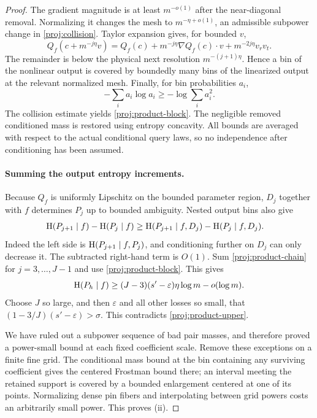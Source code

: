 \begin{proof}
The gradient magnitude is at least $m^{-o(1)}$ after the
near-diagonal removal. Normalizing it changes the mesh to
$m^{-\eta+o(1)}$, an admissible subpower change in
\eqref{proj:collision}. Taylor expansion gives, for bounded $v$,
\[
 Q_f(c+m^{-j\eta}v)
 =Q_f(c)+m^{-j\eta}\nabla Q_f(c)\cdot v
      +m^{-2j\eta}v_rv_t.
\]
The remainder is below the physical next resolution
$m^{-(j+1)\eta}$. Hence a bin of the nonlinear output is
covered by boundedly many bins of the linearized output at the
relevant normalized mesh. Finally, for bin probabilities $a_i$,
\[
 -\sum_i a_i\log a_i\ge-\log\sum_i a_i^2.
\]
The collision estimate yields \eqref{proj:product-block}.
The negligible removed conditioned mass is restored using
entropy concavity. All bounds are averaged with respect to the
actual conditional query laws, so no independence after
conditioning has been assumed.

\paragraph{Summing the output entropy increments.}
Because $Q_f$ is uniformly Lipschitz on the bounded parameter
region, $D_j$ together with $f$ determines $P_j$ up to bounded
ambiguity. Nested output bins also give
\begin{align}
 \operatorname{H}(P_{j+1}\mid f)-\operatorname{H}(P_j\mid f)
 &\ge
 \operatorname{H}(P_{j+1}\mid f,D_j)-\operatorname{H}(P_j\mid f,D_j).
 \label{proj:product-chain}
\end{align}
Indeed the left side is
$\operatorname{H}(P_{j+1}\mid f,P_j)$, and conditioning further on $D_j$
can only decrease it. The subtracted right-hand term is $O(1)$.
Sum \eqref{proj:product-chain} for $j=3,\ldots,J-1$ and use
\eqref{proj:product-block}. This gives
\[
 \operatorname{H}(P_h\mid f)
 \ge (J-3)(s'-\varepsilon)\eta\log m-o(\log m).
\]
Choose $J$ so large, and then $\varepsilon$ and all other losses
so small, that $(1-3/J)(s'-\varepsilon)>\sigma$. This contradicts
\eqref{proj:product-upper}.

We have ruled out a subpower sequence of bad pair masses, and
therefore proved a power-small bound at each fixed coefficient
scale. Remove these exceptions on a finite fine grid. The
conditional mass bound at the bin containing any surviving
coefficient gives the centered Frostman bound there; an interval
meeting the retained support is covered by a bounded enlargement
centered at one of its points. Normalizing dense pin fibers and
interpolating between grid powers costs an arbitrarily small
power. This proves (ii).
\end{proof}

